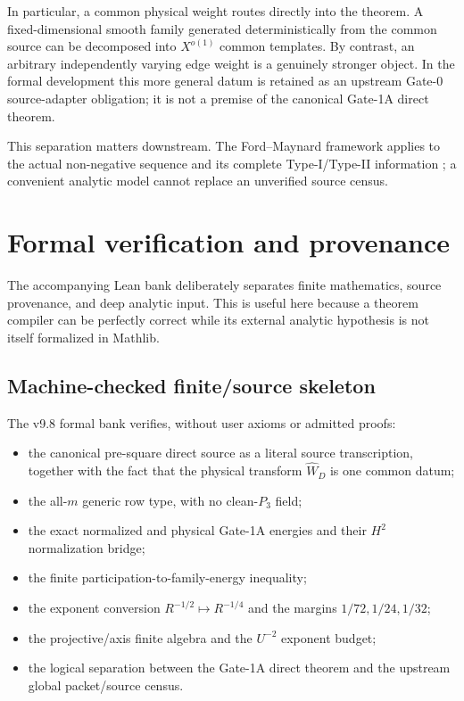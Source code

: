 \documentclass[11pt]{article}
\theoremstyle{definition}
\newcommand{\1}{\mathbf 1}
\begin{document}
In particular, a common physical weight routes directly into the theorem.
A fixed-dimensional smooth family generated deterministically from the common
source can be decomposed into $X^{o(1)}$ common templates.  By contrast, an
arbitrary independently varying edge weight is a genuinely stronger object.
In the formal development this more general datum is retained as an upstream
Gate-0 source-adapter obligation; it is not a premise of the canonical
Gate-1A direct theorem.

This separation matters downstream. The Ford--Maynard framework applies to
the actual non-negative sequence and its complete Type-I/Type-II information
\cite{FordMaynard2024}; a convenient analytic model cannot replace an
unverified source census.

\section{Formal verification and provenance}
\label{sec:formal-status}

The accompanying Lean bank deliberately separates finite mathematics, source
provenance, and deep analytic input.  This is useful here because a theorem
compiler can be perfectly correct while its external analytic hypothesis is
not itself formalized in Mathlib.

\subsection{Machine-checked finite/source skeleton}
The v9.8 formal bank verifies, without user axioms or admitted proofs:
\begin{itemize}
  \item the canonical pre-square direct source as a literal source
        transcription, together with the fact that the physical transform
        $\widehat W_D$ is one common datum;
  \item the all-$m$ generic row type, with no clean-$P_3$ field;
  \item the exact normalized and physical Gate-1A energies and their
        $H^2$ normalization bridge;
  \item the finite participation-to-family-energy inequality;
  \item the exponent conversion
        $R^{-1/2}\mapsto R^{-1/4}$ and the margins
        $1/72,1/24,1/32$;
  \item the projective/axis finite algebra and the $U^{-2}$ exponent budget;
  \item the logical separation between the Gate-1A direct theorem and the
        upstream global packet/source census.
\end{itemize}
\end{document}
